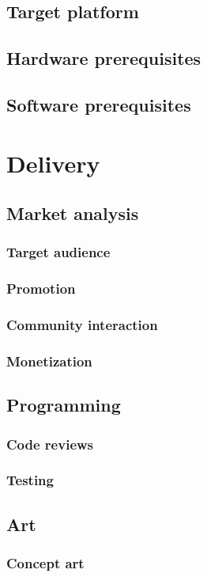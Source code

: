 \documentclass{article}[10pt]
\begin{document}
\subsection{Target platform}
\subsection{Hardware prerequisites}
\subsection{Software prerequisites}
\pagebreak

\section{Delivery}
\subsection{Market analysis}
\subsubsection{Target audience}
\subsubsection{Promotion}
\subsubsection{Community interaction}
\subsubsection{Monetization}

\subsection{Programming}
\subsubsection{Code reviews}
\subsubsection{Testing}

\subsection{Art}
\subsubsection{Concept art}
\end{document}
